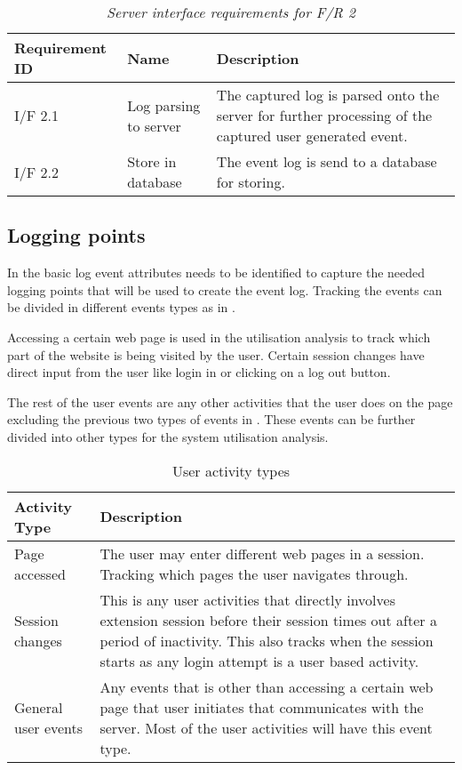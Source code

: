 \begin{table}[!htb]
	\centering
	\small
	\caption[Server interface requirements]
	{\textit{Server interface requirements for F/R 2}}
	\label{tbl:Ch2_Server_Interface_Requirements}
	\begin{tabularx}{\textwidth}{|l|l|X|}
		\hline \textbf{Requirement ID} & \textbf{Name} & \textbf{Description} \\
		\hline I/F 2.1 & Log parsing to server & The captured log is parsed onto the server for further processing of the captured user generated event.\\
		\hline I/F 2.2 & Store in database & The event log is send to a database for storing.\\
		\hline
	\end{tabularx}
\end{table}

\clearpage

\subsection{Logging points}
In  the basic log event attributes needs to be identified to capture the needed logging points that will be used to create the event log. Tracking the events can be divided in different events types as in . \par Accessing a certain web page is used in the utilisation analysis to track which part of the website is being visited by the user. Certain session changes have direct input from the user like login in or clicking on a log out button. \par The rest of the user events are any other activities that the user does on the page excluding the previous two types of events in . These events can be further divided into other types for the system utilisation analysis.

\begin{table}[!htb]
	\centering
	\small
	\caption[User activity types]
	{User activity types}
	\label{tbl:Ch2_User_ActivityTypes}
	\begin{tabularx}{\textwidth}{|l|X|}
		\hline \textbf{Activity Type} & \textbf{Description} \\
		\hline Page accessed & The user may enter different web pages in a session. Tracking which pages the user navigates through.\\
		\hline Session changes & This is any user activities that directly involves extension session before their session times out after a period of inactivity. This also tracks when the session starts as any login attempt is a user based activity.\\
		\hline General user events & Any events that is other than accessing a certain web page that user initiates that communicates with the server. Most of the user activities will have this event type.\\ 
		\hline
	\end{tabularx}
\end{table}


